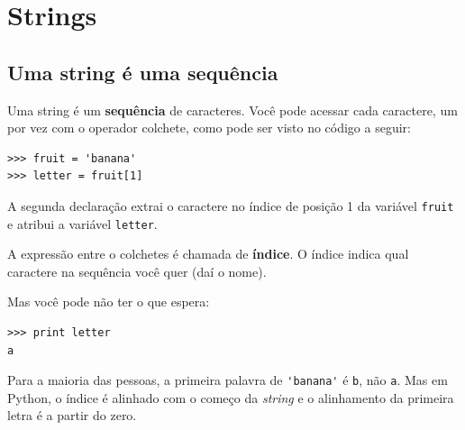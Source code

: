 
\chapter{Strings}
\label{strings}


\section{Uma string é uma sequência}

Uma string é um {\bf sequência} de caracteres. Você pode acessar cada
caractere, um por vez com o operador colchete, como pode ser visto no código 
a seguir:

\beforeverb
\begin{verbatim}
>>> fruit = 'banana'
>>> letter = fruit[1]
\end{verbatim}
\afterverb
%
%
%
A segunda declaração extrai o caractere no índice de posição 1 da variável 
{\tt fruit} e atribui a variável {\tt letter}.


A expressão entre o colchetes é chamada de {\bf índice}. O índice indica
qual caractere na sequência você quer (daí o nome).

Mas você pode não ter o que espera:

\beforeverb
\begin{verbatim}
>>> print letter
a
\end{verbatim}
\afterverb
%
%
Para a maioria das pessoas, a primeira palavra de \verb"'banana'" é {\tt b},
não {\tt a}. Mas em Python, o índice é alinhado com o começo da {\it string}
e o alinhamento da primeira letra é a partir do zero.

